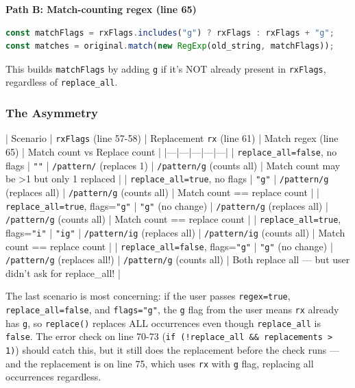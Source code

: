 \textbf{Path B: Match-counting regex (line 65)}



\begin{lstlisting}[language=TypeScript]
const matchFlags = rxFlags.includes("g") ? rxFlags : rxFlags + "g";
const matches = original.match(new RegExp(old_string, matchFlags));

\end{lstlisting}



This builds \texttt{matchFlags} by adding \texttt{g} if it's NOT already present in \texttt{rxFlags}, regardless of \texttt{replace\_all}.

\subsubsection*{The Asymmetry}

| Scenario | \texttt{rxFlags} (line 57-58) | Replacement \texttt{rx} (line 61) | Match regex (line 65) | Match count vs Replace count |
|---|---|---|---|---|
| \texttt{replace\_all=false}, no flags | \texttt{""} | \texttt{/pattern/} (replaces 1) | \texttt{/pattern/g} (counts all) | Match count may be >1 but only 1 replaced |
| \texttt{replace\_all=true}, no flags | \texttt{"g"} | \texttt{/pattern/g} (replaces all) | \texttt{/pattern/g} (counts all) | Match count == replace count |
| \texttt{replace\_all=true}, flags=\texttt{"g"} | \texttt{"g"} (no change) | \texttt{/pattern/g} (replaces all) | \texttt{/pattern/g} (counts all) | Match count == replace count |
| \texttt{replace\_all=true}, flags=\texttt{"i"} | \texttt{"ig"} | \texttt{/pattern/ig} (replaces all) | \texttt{/pattern/ig} (counts all) | Match count == replace count |
| \texttt{replace\_all=false}, flags=\texttt{"g"} | \texttt{"g"} (no change) | \texttt{/pattern/g} (replaces all!) | \texttt{/pattern/g} (counts all) | Both replace all — but user didn't ask for replace\_all! |

The last scenario is most concerning: if the user passes \texttt{regex=true}, \texttt{replace\_all=false}, and \texttt{flags="g"}, the \texttt{g} flag from the user means \texttt{rx} already has \texttt{g}, so \texttt{replace()} replaces ALL occurrences even though \texttt{replace\_all} is \texttt{false}. The error check on line 70-73 (\texttt{if (!replace\_all \&\& replacements > 1)}) should catch this, but it still does the replacement before the check runs — and the replacement is on line 75, which uses \texttt{rx} with \texttt{g} flag, replacing all occurrences regardless.

